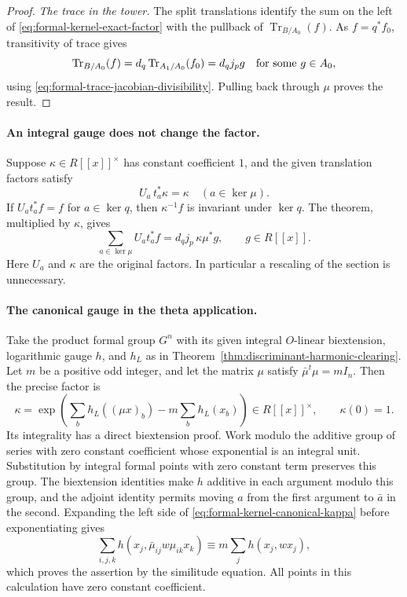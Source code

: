 \begin{proof}
\emph{The trace in the tower.}
The split translations identify the sum on the left of
\eqref{eq:formal-kernel-exact-factor} with the pullback of
$\operatorname{Tr}_{B/A_0}(f)$.
As $f=q^*f_0$, transitivity of trace gives
\[
 \operatorname{Tr}_{B/A_0}(f)
          =d_q\operatorname{Tr}_{A_1/A_0}(f_0)=d_qj_p g
                  \quad\hbox{for some }g\in A_0,
\]
using \eqref{eq:formal-trace-jacobian-divisibility}.  Pulling back through
$\mu$ proves the result.
\end{proof}

\paragraph{An integral gauge does not change the factor.}
Suppose $\kappa\in R[[x]]^\times$ has constant coefficient $1$, and the
given translation factors satisfy
\[
              U_a\,t_a^*\kappa=\kappa
                              \quad(a\in\ker\mu).
\]
If $U_a t_a^*f=f$ for $a\in\ker q$, then $\kappa^{-1}f$ is invariant
under $\ker q$.  The theorem, multiplied by $\kappa$, gives
\begin{equation}\label{eq:formal-kernel-twisted-factor}
       \sum_{a\in\ker\mu}U_a t_a^*f
                      =d_qj_p\,\kappa\mu^*g,
                         \qquad g\in R[[x]].
\end{equation}
Here $U_a$ and $\kappa$ are the original factors.  In particular a
rescaling of the section is unnecessary.

\paragraph{The canonical gauge in the theta application.}
Take the product formal group $G^n$ with its given integral
$O$-linear biextension, logarithmic gauge $h$, and $h_L$ as in
Theorem~\ref{thm:discriminant-harmonic-clearing}.  Let $m$ be a positive
odd integer, and let the matrix $\mu$
satisfy $\bar\mu^{t}\mu=m I_n$.
Then the precise factor is
\begin{equation}\label{eq:formal-kernel-canonical-kappa}
 \kappa=\exp\left(\sum_b h_L((\mu x)_b)
                              -m\sum_b h_L(x_b)\right)\in R[[x]]^\times,
                         \qquad\kappa(0)=1.
\end{equation}
Its integrality has a direct biextension proof.  Work modulo the additive
group of series with zero constant coefficient whose exponential is an
integral unit.  Substitution by integral formal points with zero constant
term preserves this group.
The biextension identities make $h$ additive in each argument modulo this
group, and the adjoint identity permits moving $a$ from the first argument
to $\bar a$ in the second.  Expanding the left side of
\eqref{eq:formal-kernel-canonical-kappa} before exponentiating gives
\[
 \sum_{i,j,k}h(x_j,\bar\mu_{ij}w\mu_{ik}x_k)
                      \equiv m\sum_jh(x_j,w x_j),
\]
which proves the assertion by the similitude equation.  All points in this
calculation have zero constant coefficient.

